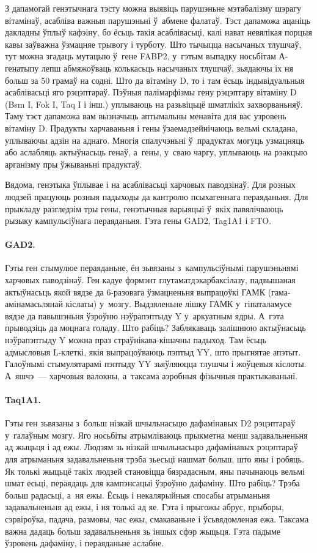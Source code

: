 З дапамогай генэтычнага тэсту можна выявіць парушэньне мэтабалізму шэрагу вітамінаў, асабліва важныя парушэньні ў~абмене фалатаў. Тэст дапаможа ацаніць дакладны ўплыў кафэіну, бо ёсьць такія асаблівасьці, калі нават невялікая порцыя кавы заўважна ўзмацняе трывогу і турботу. Што тычыцца насычаных тлушчаў, тут можна згадаць мутацыю ў~гене FABP2, у~гэтым выпадку носьбітам А-генатыпу лепш абмяжоўваць колькасьць насычаных тлушчаў, зьядаючы іх ня больш за 50 грамаў на содні. Што да вітаміну D, то і там ёсьць індывідуальныя асаблівасьці яго рэцэптараў. Пэўныя палімарфізмы гену рэцэптару вітаміну D (Bsm I, Fok I, Taq I і інш.) уплываюць на разьвіцьцё шматлікіх захворваньняў. Таму тэст дапаможа вам вызначыць аптымальны менавіта для вас узровень вітаміну D. Прадукты харчаваньня і гены ўзаемадзейнічаюць вельмі складана, уплываючы адзін на аднаго. Многія спалучэньні ў~прадуктах могуць узмацняць або аслабляць актыўнасьць генаў, а~гены, у~сваю чаргу, уплываюць на рэакцыю арганізму пры ўжываньні прадуктаў.

Вядома, генэтыка ўплывае і на асаблівасьці харчовых паводзінаў. Для розных людзей працуюць розныя падыходы да кантролю псыхагеннага пераяданьня. Для прыкладу разгледзім тры гены, генэтычныя варыяцыі ў~якіх павялічваюць рызыку кампульсіўнага пераяданьня. Гэта гены GAD2, Tag1A1 і FTO.

\paragraph{GAD2.}
Гэты ген стымулюе пераяданьне, ён зьвязаны з~кампульсіўнымі парушэньнямі харчовых паводзінаў. Ген кадуе фэрмэнт глутаматдэкарбаксілазу, падвышаная актыўнасьць якой вядзе да 6-разовага ўзмацненьня выпрацоўкі ГАМК (гама-амінамасьлянай кіслаты) у~мозгу. Выдзяленьне лішку ГАМК у~гіпаталамусе вядзе да павышэньня ўзроўню нэўрапэптыду Y у~аркуатным ядры. А~гэта прыводзіць да моцнага голаду. Што рабіць? Заблякаваць залішнюю актыўнасьць нэўрапэптыду Y можна праз страўнікава-кішачны падыход. Там ёсьць адмысловыя L-клеткі, якія выпрацоўваюць пэптыд YY, што прыгнятае апэтыт. Галоўнымі стымулятарамі пэптыду YY зьяўляюцца тлушчы і жоўцевыя кіслоты. А~яшчэ~--- харчовыя валокны, а~таксама аэробныя фізычныя практыкаваньні.

\paragraph{Taq1A1.}
Гэты ген зьвязаны з~больш нізкай шчыльнасьцю дафамінавых D2 рэцэптараў у~галаўным мозгу. Яго носьбіты атрымліваюць прыкметна менш задавальненьня ад жыцьця і ад ежы. Людзям зь нізкай шчыльнасьцю дафамінавых рэцэптараў для атрыманьня задавальненьня трэба зьесьці нашмат больш, што яны і робяць. Як толькі жыцьцё такіх людзей становіцца бязрадасным, яны пачынаюць вельмі шмат есьці, пераядаць для кампэнсацыі ўзроўню дафаміну. Што рабіць? Трэба больш радасьці, а~ня ежы. Ёсьць і некалярыйныя спосабы атрыманьня задавальненьня ад ежы, і ня толькі ад яе. Гэта і прыгожы абрус, прыборы, сэрвіроўка, падача, размовы, час ежы, смакаваньне і ўсьвядомленая ежа. Таксама важна дадаць больш задавальненьня зь іншых сфэр жыцьця. Гэта падыме ўзровень дафаміну, і пераяданьне аслабне.

